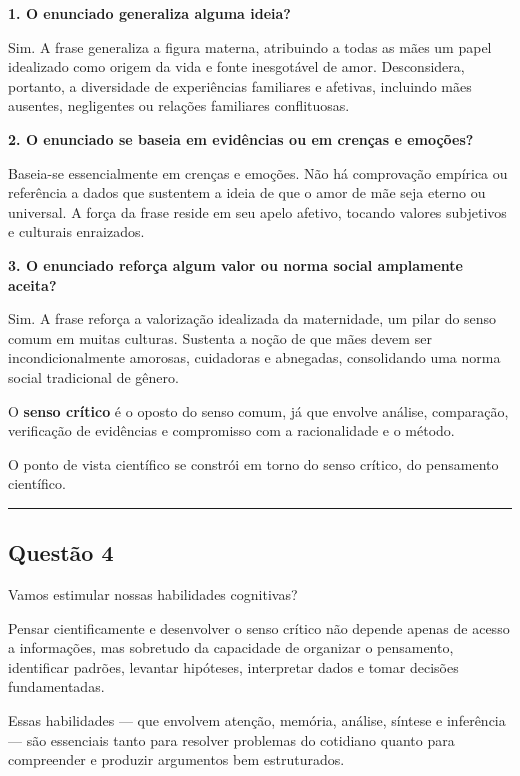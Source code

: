 \documentclass[
]{book}
\begin{document}
\textbf{1. O enunciado generaliza alguma ideia?}

Sim. A frase generaliza a figura materna, atribuindo a todas as mães um papel idealizado como origem da vida e fonte inesgotável de amor. Desconsidera, portanto, a diversidade de experiências familiares e afetivas, incluindo mães ausentes, negligentes ou relações familiares conflituosas.

\textbf{2. O enunciado se baseia em evidências ou em crenças e emoções?}

Baseia-se essencialmente em crenças e emoções. Não há comprovação empírica ou referência a dados que sustentem a ideia de que o amor de mãe seja eterno ou universal. A força da frase reside em seu apelo afetivo, tocando valores subjetivos e culturais enraizados.

\textbf{3. O enunciado reforça algum valor ou norma social amplamente aceita?}

Sim. A frase reforça a valorização idealizada da maternidade, um pilar do senso comum em muitas culturas. Sustenta a noção de que mães devem ser incondicionalmente amorosas, cuidadoras e abnegadas, consolidando uma norma social tradicional de gênero.

O \textbf{senso crítico} é o oposto do senso comum, já que envolve análise, comparação, verificação de evidências e compromisso com a racionalidade e o método.

O ponto de vista científico se constrói em torno do senso crítico, do pensamento científico.

\begin{center}\rule{0.5\linewidth}{0.5pt}\end{center}

\subsection{Questão 4}\label{questuxe3o-4-2}

Vamos estimular nossas habilidades cognitivas?

Pensar cientificamente e desenvolver o senso crítico não depende apenas de acesso a informações, mas sobretudo da capacidade de organizar o pensamento, identificar padrões, levantar hipóteses, interpretar dados e tomar decisões fundamentadas.

Essas habilidades --- que envolvem atenção, memória, análise, síntese e inferência --- são essenciais tanto para resolver problemas do cotidiano quanto para compreender e produzir argumentos bem estruturados.
\end{document}
